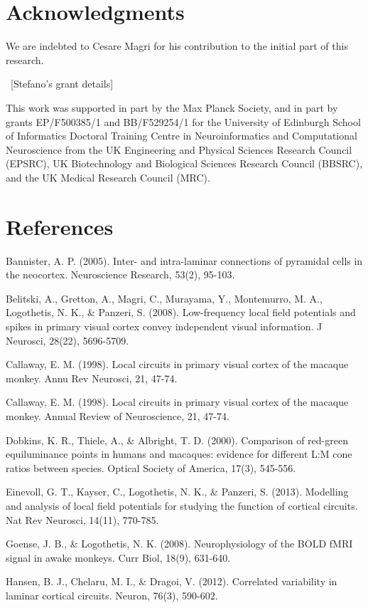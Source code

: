\documentclass{article}
\begin{document}
\section{Acknowledgments}
We are indebted to Cesare Magri for his contribution to the initial part of this research. 

\ [Stefano's grant details]

This work was supported in part by the Max Planck Society, and in part by grants EP/F500385/1 and BB/F529254/1 for the University of Edinburgh School of Informatics Doctoral Training Centre in Neuroinformatics and Computational Neuroscience from the UK Engineering and Physical Sciences Research Council (EPSRC), UK Biotechnology and Biological Sciences Research Council (BBSRC), and the UK Medical Research Council (MRC).

\section{References}
Bannister, A. P. (2005). Inter- and intra-laminar connections of pyramidal cells in the neocortex. Neuroscience Research, 53(2), 95-103.

Belitski, A., Gretton, A., Magri, C., Murayama, Y., Montemurro, M. A., Logothetis, N. K., \& Panzeri, S. (2008). Low-frequency local field potentials and spikes in primary visual cortex convey independent visual information. J Neurosci, 28(22), 5696-5709.

Callaway, E. M. (1998). Local circuits in primary visual cortex of the macaque monkey. Annu Rev Neurosci, 21, 47-74.

Callaway, E. M. (1998). Local circuits in primary visual cortex of the macaque monkey. Annual Review of Neuroscience, 21, 47-74.

Dobkins, K. R., Thiele, A., \& Albright, T. D. (2000). Comparison of red-green equiluminance points in humans and macaques: evidence for different L:M cone ratios between species. Optical Society of America, 17(3), 545-556.

Einevoll, G. T., Kayser, C., Logothetis, N. K., \& Panzeri, S. (2013). Modelling and analysis of local field potentials for studying the function of cortical circuits. Nat Rev Neurosci, 14(11), 770-785.

Goense, J. B., \& Logothetis, N. K. (2008). Neurophysiology of the BOLD fMRI signal in awake monkeys. Curr Biol, 18(9), 631-640.

Hansen, B. J., Chelaru, M. I., \& Dragoi, V. (2012). Correlated variability in laminar cortical circuits. Neuron, 76(3), 590-602.
\end{document}
